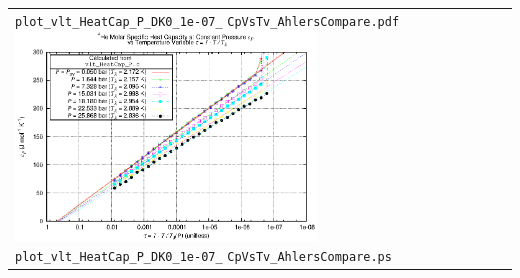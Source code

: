 \documentclass[11pt]{article}
\begin{document}
\begin{center}
\begin{tabular}[\textwidth]{p{8cm}p{8cm}}
  \verb|plot_vlt_HeatCap_P_DK0_1e-07_|\newline
  \verb|CpVsTv_AhlersCompare.pdf|
\else
  \includegraphics[width=8cm]{plot_vlt_HeatCap_P_DK0_1e-07_CpVsTv_AhlersCompare.ps}\newline
  \verb|plot_vlt_HeatCap_P_DK0_1e-07_|\newline
  \verb|CpVsTv_AhlersCompare.ps|
\fi
&
 \\
\end{tabular}
\end{center}
\end{document}
